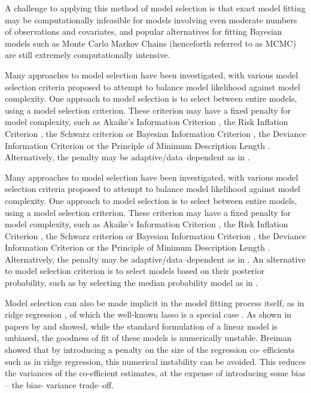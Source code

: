 A challenge to applying this method of model selection is that exact model fitting may be computationally
infeasible for models involving even moderate numbers of observations and covariates, and popular alternatives
for fitting Bayesian models such as Monte Carlo Markov Chains (henceforth referred to as MCMC) are still
extremely computationally intensive.

Many approaches to model selection have been investigated, with various model selection criteria proposed to
attempt to balance model likelihood against model complexity. One approach to model selection is to select
between entire models, using a model selection criterion. These criterion may have a fixed penalty for model
complexity, such as Akaike's Information Criterion \cite{Akaike1974}, the Risk Inflation Criterion
\cite{Foster1994}, the Schwarz criterion or Bayesian Information Criterion \cite{Schwarz1978}, the Deviance
Information Criterion \cite{Spiegelhalter2016} or the Principle of Minimum Description Length
\cite{Hansen2001}. Alternatively, the penalty may be adaptive/data--dependent as in \cite{George2000}.

Many approaches to model selection have been investigated, with various model selection criteria proposed to
attempt to balance model likelihood against model complexity. One approach to model selection is to select
between entire models, using a model selection criterion. These criterion may have a fixed penalty for model
complexity, such as Akaike's Information Criterion \citep{Akaike1974}, the Risk Inflation Criterion
\citep{Foster1994}, the Schwarz criterion or Bayesian Information Criterion \citep{Schwarz1978}, the Deviance
Information Criterion \citep{Spiegelhalter2016} or the Principle of Minimum Description Length
\citep{Hansen2001}. Alternatively, the penalty may be adaptive/data--dependent as in \citep{George2000}. An
alternative to model selection criterion is to select models based on their posterior probability, such as by
selecting the median probability model as in \citep{Barbieri2004}.

Model selection can also be made implicit in the model fitting process itself, as in ridge regression
\cite{Casella1980}, of which the well-known lasso is a special case \cite{Tibshirani1996}. As shown in
papers by \cite{Breiman1996} and \cite{Efron2013} showed, while  the standard formulation of a linear model
is unbiased, the goodness of fit of these models is numerically  unstable. Breiman showed that by introducing
a penalty on the size of the regression co- efficients such as  in ridge regression, this numerical
instability can be avoided. This reduces the variances of the co-efficient estimates, at the expense of
introducing some bias -- the bias- variance trade--off.

